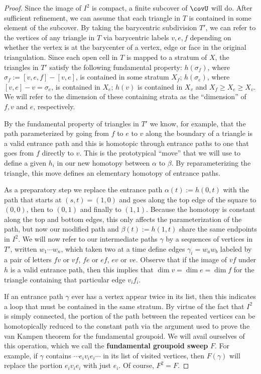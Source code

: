 \begin{proof}
	Since the image of $I^2$ is compact, a finite subcover of $\covU$ will do. After sufficient refinement, we can assume that each triangle in $T$ is contained in some element of the subcover. By taking the barycentric subdivision $T'$, we can refer to the vertices of any triangle in $T$ via barycentric labels $v,e,f$ depending on whether the vertex is at the barycenter of a vertex, edge or face in the original triangulation. Since each open cell in $T$ is mapped to a stratum of $X$, the triangles in $T'$ satisfy the following fundamental property: $h(\sigma_f)$, where $\sigma_f:=[v,e,f]-[v,e]$, is contained in some stratum $X_{f}$; $h(\sigma_e)$, where $[v,e]-v=\sigma_e$, is contained in $X_{e}$; $h(v)$ is contained in $X_{v}$ and $X_{f}\geq X_{e} \geq X_{v}$. We will refer to the dimension of these containing strata as the ``dimension'' of $f,v$ and $e$, respectively.
	
	By the fundamental property of triangles in $T'$ we know, for example, that the path parameterized by going from $f$ to $e$ to $v$ along the boundary of a triangle is a valid entrance path and this is homotopic through entrance paths to one that goes from $f$ directly to $v$. This is the prototypical ``move'' that we will use to define a given $h_i$ in our new homotopy between $\alpha$ to $\beta$. By reparameterizing the triangle, this move defines an elementary homotopy of entrance paths.
	
	As a preparatory step we replace the entrance path $\alpha(t):=h(0,t)$ with the path that starts at $(s,t)=(1,0)$ and goes along the top edge of the square to $(0,0)$, then to $(0,1)$ and finally to $(1,1)$. Because the homotopy is constant along the top and bottom edges, this only affects the parameterization of the path, but now our modified path and $\beta(t):=h(1,t)$ share the same endpoints in $I^2$. We will now refer to our intermediate paths $\gamma$ by a sequences of vertices in $T'$, written $w_1\cdots w_n$, which taken two at a time define edges $\gamma_i=w_{a} w_{b}$ labeled by a pair of letters $fv$ or $vf$, $fe$ or $ef$, $ev$ or $ve$. Observe that if the image of $vf$ under $h$ is a valid entrance path, then this implies that $\dim v =\dim e = \dim f$ for the triangle containing that particular edge $v_if_i$. 
	
	If an entrance path $\gamma$ ever has a vertex appear twice in its list, then this indicates a loop that must be contained in the same stratum. By virtue of the fact that $I^2$ is simply connected, the portion of the path between the repeated vertices can be homotopically reduced to the constant path via the argument used to prove the van Kampen theorem for the fundamental groupoid. We will avail ourselves of this operation, which we call the \textbf{fundamental groupoid sweep} $F$. For example, if $\gamma$ contains $\cdots e_iv_ie_i\cdots $ in its list of visited vertices, then $F(\gamma)$ will replace the portion $e_iv_ie_i$ with just $e_i$. Of course, $F^2=F$.
	

\end{proof}

